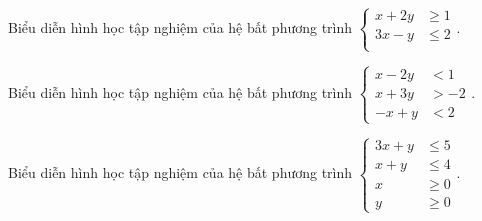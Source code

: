 \begin{baitap}%
	Biểu diễn hình học tập nghiệm của hệ bất phương trình
	$\left\{\begin{aligned}
		x+2y &\geq 1\\
		3x-y & \leq 2 \\
	\end{aligned}\right.$.
\end{baitap}
\begin{baitap}%
	Biểu diễn hình học tập nghiệm của hệ bất phương trình
	$\left\{\begin{aligned}
		x-2y &< 1\\
		x+3y &>-2 \\
		-x+y &<2
	\end{aligned}\right.$.
\end{baitap}
\begin{baitap}%
	Biểu diễn hình học tập nghiệm của hệ bất phương trình
	$\left\{\begin{aligned}
		3x+y & \leq 5\\
		x+y & \leq 4 \\
		x &\geq 0\\
		y &\geq 0
	\end{aligned}\right.$.
\end{baitap}

